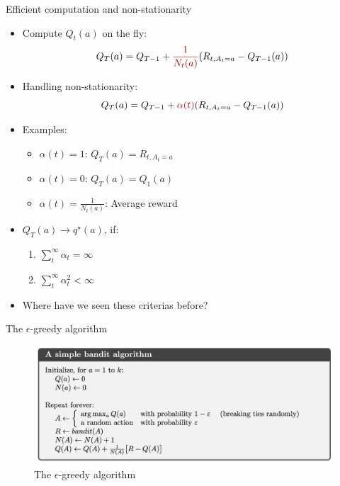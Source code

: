 \documentclass[10pt]{beamer}
\begin{document}
\begin{frame}{Efficient computation and non-stationarity}

\begin{itemize}
\item Compute $Q_t(a)$ on the fly:
\[
Q_T(a) = Q_{T-1} + {\color{uured} \frac{1}{N_t(a)}} (R_{t,A_t=a} - Q_{T-1}(a))
\]
\pause
\item Handling non-stationarity:
\[
Q_T(a) = Q_{T-1} + {\color{uured} \alpha(t)} (R_{t, A_t=a} - Q_{T-1}(a))
\]
\pause
\item Examples:
\begin{itemize}
\item $\alpha(t) = 1$: $Q_T(a) = R_{t,A_t=a}$\pause
\item $\alpha(t) = 0$: $Q_T(a) = Q_{1}(a)$\pause
\item $\alpha(t) = \frac{1}{N_t(a)}$: Average reward\pause
\end{itemize}
\item $Q_T(a) \rightarrow q^\star(a)$, if:\pause
\begin{enumerate}
\item $\sum^\infty_t \alpha_t = \infty$
\item $\sum^\infty_t \alpha^2_t < \infty$
\end{enumerate}
\item Where have we seen these criterias before?
\end{itemize}

\end{frame}

\begin{frame}{The $\epsilon$-greedy algorithm}

\begin{figure}[h]
\centering
\includegraphics[width=1\textwidth]{fig/sutton_bandit.png}
\caption{The $\epsilon$-greedy algorithm}
\end{figure}

\end{frame}
\end{document}
